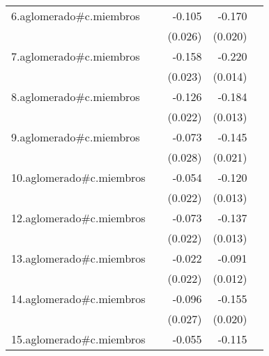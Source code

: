 {\begin{longtable}{l*{4}{D{.}{.}{-1}}}
\addlinespace
6.aglomerado#c.miembros&                     &      -0.105\sym{***}&      -0.170\sym{***}&                     \\
            &                     &     (0.026)         &     (0.020)         &                     \\
\addlinespace
7.aglomerado#c.miembros&                     &      -0.158\sym{***}&      -0.220\sym{***}&                     \\
            &                     &     (0.023)         &     (0.014)         &                     \\
\addlinespace
8.aglomerado#c.miembros&                     &      -0.126\sym{***}&      -0.184\sym{***}&                     \\
            &                     &     (0.022)         &     (0.013)         &                     \\
\addlinespace
9.aglomerado#c.miembros&                     &      -0.073\sym{**} &      -0.145\sym{***}&                     \\
            &                     &     (0.028)         &     (0.021)         &                     \\
\addlinespace
10.aglomerado#c.miembros&                     &      -0.054\sym{*}  &      -0.120\sym{***}&                     \\
            &                     &     (0.022)         &     (0.013)         &                     \\
\addlinespace
12.aglomerado#c.miembros&                     &      -0.073\sym{**} &      -0.137\sym{***}&                     \\
            &                     &     (0.022)         &     (0.013)         &                     \\
\addlinespace
13.aglomerado#c.miembros&                     &      -0.022         &      -0.091\sym{***}&                     \\
            &                     &     (0.022)         &     (0.012)         &                     \\
\addlinespace
14.aglomerado#c.miembros&                     &      -0.096\sym{***}&      -0.155\sym{***}&                     \\
            &                     &     (0.027)         &     (0.020)         &                     \\
\addlinespace
15.aglomerado#c.miembros&                     &      -0.055\sym{*}  &      -0.115\sym{***}&                     \\

\end{longtable}}
